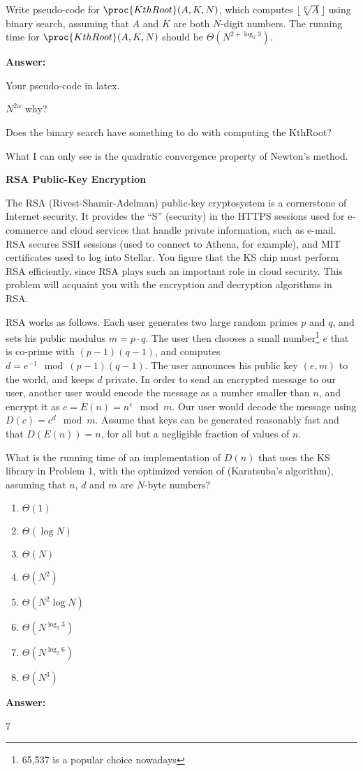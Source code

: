 \documentclass[12pt,twoside]{article}
\newcommand{\answer}{
 \par\medskip
 \textbf{Answer:}
}
\newcommand{\answerIp}{ \answer
Your pseudo-code in latex.

$ N^{2\alpha} $  why?

Does the binary search have something to do with computing the KthRoot?

What I can only see is the quadratic convergence property of Newton's method.
}
\newcommand{\answerIIa}{ \answer
7
}
\begin{document}
\begin{problems}
\begin{problemparts}
\problempart {} Write pseudo-code for $\proc{KthRoot}(A, K, N)$, which
computes $\lfloor \sqrt[K]{A} \rfloor$ using binary search, assuming that $A$
and $K$ are both $N$-digit numbers. The running time for $\proc{KthRoot}(A, K,
N)$ should be $\Theta(N^{2 + \log_2 3})$.

\answerIp

\end{problemparts}

\newpage

\problem {} \textbf{RSA Public-Key Encryption}

The RSA (Rivest-Shamir-Adelman) public-key cryptosystem is a cornerstone of
Internet security. It provides the ``S'' (security) in the HTTPS sessions used
for e-commerce and cloud services that handle private information, such as
e-mail. RSA secures SSH sessions (used to connect to Athena, for example), and
MIT certificates used to log into Stellar. You figure that the KS chip must
perform RSA efficiently, since RSA plays such an important role in cloud
security. This problem will acquaint you with the encryption and decryption
algorithms in RSA.

RSA works as follows. Each user generates two large random primes $p$ and $q$,
and sets his public modulus $m = p \cdot q$. The user then chooses a small
number\footnote{65,537 is a popular choice nowadays} $e$ that is co-prime with
$(p - 1)(q - 1)$, and computes $d = e^{-1} \mod (p - 1)(q - 1)$. The user
announces his public key $(e, m)$ to the world, and keeps $d$ private. In order
to send an encrypted message to our user, another user would encode the message
as a number smaller than $n$, and encrypt it as $c = E(n) = n^e \mod m$. Our
user would decode the message using $D(c) = c^d \mod m$. Assume that keys can be
generated reasonably fast and that $D(E(n)) = n$, for all but a negligible
fraction of values of $n$.

\begin{problemparts}
\problempart {} What is the running time of an implementation of $D(n)$
that uses the KS library in Problem 1, with the optimized version of
 (Karatsuba's algorithm), assuming that $n$, $d$ and $m$ are
$N$-byte numbers?
\begin{enumerate}
  \item $\Theta(1)$
  \item $\Theta(\log N)$
  \item $\Theta(N)$
  \item $\Theta(N^2)$
  \item $\Theta(N^2 \log N)$
  \item $\Theta(N^{\log_2 3})$
  \item $\Theta(N^{\log_2 6})$
  \item $\Theta(N^3)$
\end{enumerate}
\answerIIa


\end{problemparts}
\end{problems}
\end{document}
